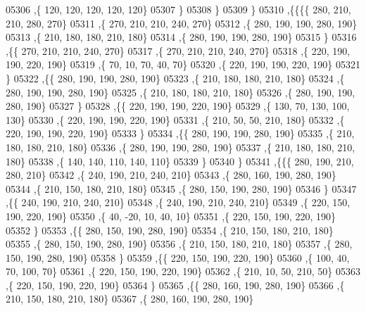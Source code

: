 \begin{DoxyCode}
05306     ,\{   120,   120,   120,   120,   120\}
05307     \}
05308    \}
05309   \}
05310  ,\{\{\{\{   280,   210,   210,   280,   270\}
05311     ,\{   270,   210,   210,   240,   270\}
05312     ,\{   280,   190,   190,   280,   190\}
05313     ,\{   210,   180,   180,   210,   180\}
05314     ,\{   280,   190,   190,   280,   190\}
05315     \}
05316    ,\{\{   270,   210,   210,   240,   270\}
05317     ,\{   270,   210,   210,   240,   270\}
05318     ,\{   220,   190,   190,   220,   190\}
05319     ,\{    70,    10,    70,    40,    70\}
05320     ,\{   220,   190,   190,   220,   190\}
05321     \}
05322    ,\{\{   280,   190,   190,   280,   190\}
05323     ,\{   210,   180,   180,   210,   180\}
05324     ,\{   280,   190,   190,   280,   190\}
05325     ,\{   210,   180,   180,   210,   180\}
05326     ,\{   280,   190,   190,   280,   190\}
05327     \}
05328    ,\{\{   220,   190,   190,   220,   190\}
05329     ,\{   130,    70,   130,   100,   130\}
05330     ,\{   220,   190,   190,   220,   190\}
05331     ,\{   210,    50,    50,   210,   180\}
05332     ,\{   220,   190,   190,   220,   190\}
05333     \}
05334    ,\{\{   280,   190,   190,   280,   190\}
05335     ,\{   210,   180,   180,   210,   180\}
05336     ,\{   280,   190,   190,   280,   190\}
05337     ,\{   210,   180,   180,   210,   180\}
05338     ,\{   140,   140,   110,   140,   110\}
05339     \}
05340    \}
05341   ,\{\{\{   280,   190,   210,   280,   210\}
05342     ,\{   240,   190,   210,   240,   210\}
05343     ,\{   280,   160,   190,   280,   190\}
05344     ,\{   210,   150,   180,   210,   180\}
05345     ,\{   280,   150,   190,   280,   190\}
05346     \}
05347    ,\{\{   240,   190,   210,   240,   210\}
05348     ,\{   240,   190,   210,   240,   210\}
05349     ,\{   220,   150,   190,   220,   190\}
05350     ,\{    40,   -20,    10,    40,    10\}
05351     ,\{   220,   150,   190,   220,   190\}
05352     \}
05353    ,\{\{   280,   150,   190,   280,   190\}
05354     ,\{   210,   150,   180,   210,   180\}
05355     ,\{   280,   150,   190,   280,   190\}
05356     ,\{   210,   150,   180,   210,   180\}
05357     ,\{   280,   150,   190,   280,   190\}
05358     \}
05359    ,\{\{   220,   150,   190,   220,   190\}
05360     ,\{   100,    40,    70,   100,    70\}
05361     ,\{   220,   150,   190,   220,   190\}
05362     ,\{   210,    10,    50,   210,    50\}
05363     ,\{   220,   150,   190,   220,   190\}
05364     \}
05365    ,\{\{   280,   160,   190,   280,   190\}
05366     ,\{   210,   150,   180,   210,   180\}
05367     ,\{   280,   160,   190,   280,   190\}

\end{DoxyCode}
